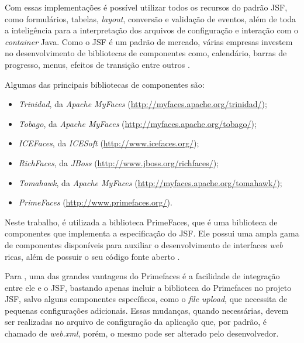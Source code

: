 \par Com essas implementações é possível utilizar todos os recursos do padrão JSF,
como formulários, tabelas, \textit{layout}, conversão e validação de eventos,
além de toda a inteligência para a interpretação dos arquivos de configuração e
interação com o \textit{container} Java. Como o JSF é um padrão de mercado,
várias empresas investem no desenvolvimento de bibliotecas de componentes como, calendário, barras de progresso, menus,
efeitos de transição entre outros \cite{livro_programacao_java_para_web}.

\par Algumas das principais bibliotecas de componentes são:

\begin{itemize}
	\item \textit{Trinidad}, da \textit{Apache MyFaces}
	(\url{http://myfaces.apache.org/trinidad/});
	
	\item \textit{Tobago}, da \textit{Apache MyFaces}
	(\url{http://myfaces.apache.org/tobago/});
	
	\item \textit{ICEFaces}, da \textit{ICESoft} (\url{http://www.icefaces.org/});
	
	\item \textit{RichFaces}, da \textit{JBoss}
	(\url{http://www.jboss.org/richfaces/});
	
	\item \textit{Tomahawk}, da \textit{Apache MyFaces}
	(\url{http://myfaces.apache.org/tomahawk/});
	
	\item \textit{PrimeFaces} (\url{http://www.primefaces.org/}).
\end{itemize}

\par Neste trabalho, é utilizada a biblioteca PrimeFaces, que é uma
biblioteca de componentes que implementa a especificação do JSF. Ele possui uma ampla gama de componentes disponíveis 
para auxiliar o desenvolvimento de interfaces \textit{web} ricas, além de possuir o seu
código fonte aberto \cite{ross_borsoi_uso_primefaces}.

\par Para , uma das grandes vantagens
do Primefaces é a facilidade de integração entre ele e o JSF, bastando apenas
incluir a biblioteca do Primefaces no projeto JSF, salvo alguns componentes
específicos, como o \textit{file upload}, que necessita de pequenas configurações adicionais.
Essas mudanças, quando necessárias, devem ser realizadas no arquivo de
configuração da aplicação que, por padrão, é chamado de \textit{web.xml}, porém,
o mesmo pode ser alterado pelo desenvolvedor.

